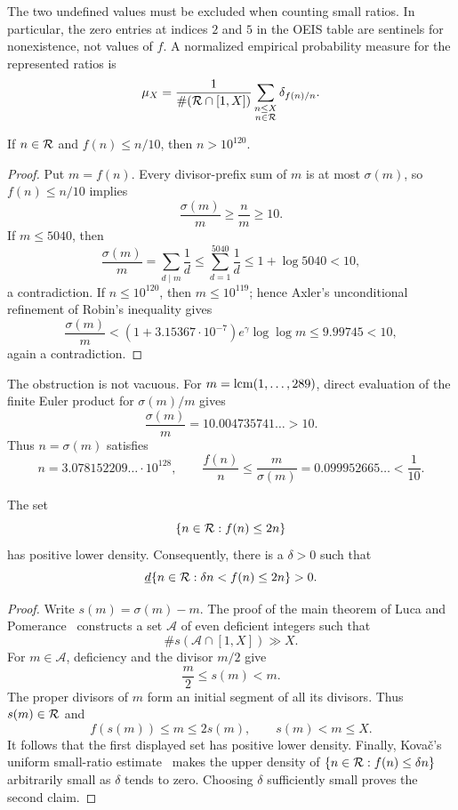 The two undefined values must be excluded when counting small ratios.
In particular, the zero entries at indices $2$ and $5$ in the OEIS table
\cite{OEIS1054} are sentinels for nonexistence, not values of $f$.
A normalized empirical probability measure for the represented ratios is
\[
 \mu_X=
 \frac{1}{\#(\mathcal R\cap[1,X])}
 \sum_{\substack{n\leq X\\n\in\mathcal R}}
 \delta_{f(n)/n}.
\]

\begin{proposition}
\label{prop:fraiture-small-ratio}
If $n\in\mathcal R$ and $f(n)\leq n/10$, then $n>10^{120}$.
\end{proposition}

\begin{proof}
Put $m=f(n)$.  Every divisor-prefix sum of $m$ is at most $\sigma(m)$,
so $f(n)\leq n/10$ implies
\[
 \frac{\sigma(m)}m\geq\frac nm\geq10.
\]
If $m\leq5040$, then
\[
 \frac{\sigma(m)}m=\sum_{d\mid m}\frac1d
 \leq\sum_{d=1}^{5040}\frac1d
 \leq1+\log5040<10,
\]
a contradiction.  If $n\leq10^{120}$, then $m\leq10^{119}$; hence
Axler's unconditional refinement of Robin's inequality
\cite[Corollary 2]{AxlerRobin} gives
\[
 \frac{\sigma(m)}m
 <(1+3.15367\cdot10^{-7})e^\gamma\log\log m
 \leq9.99745<10,
\]
again a contradiction.
\end{proof}

The obstruction is not vacuous.  For
$m=\operatorname{lcm}(1,\ldots,289)$, direct evaluation of the finite Euler product for
$\sigma(m)/m$ gives
\[
 \frac{\sigma(m)}m=10.004735741\ldots>10.
\]
Thus $n=\sigma(m)$ satisfies
\[
 n=3.078152209\ldots\cdot10^{128},
 \qquad
 \frac{f(n)}n\leq\frac m{\sigma(m)}
 =0.099952665\ldots<\frac1{10}.
\]

\begin{proposition}
\label{prop:fraiture-positive-mass}
The set
\[
 \{n\in\mathcal R:f(n)\leq2n\}
\]
has positive lower density.  Consequently, there is a $\delta>0$ such
that
\[
 \underline d\{n\in\mathcal R:\delta n<f(n)\leq2n\}>0.
\]
\end{proposition}

\begin{proof}
Write $s(m)=\sigma(m)-m$.  The proof of the main theorem of Luca and
Pomerance~\cite[proof of Theorem 1.2, \S3]{LucaPomerance} constructs a set
$\mathcal A$ of even deficient integers such that
\[
 \#s(\mathcal A\cap[1,X])\gg X.
\]
For $m\in\mathcal A$, deficiency and the divisor $m/2$ give
\[
 \frac m2\leq s(m)<m.
\]
The proper divisors of $m$ form an initial segment of all its divisors.
Thus $s(m)\in\mathcal R$ and
\[
 f(s(m))\leq m\leq2s(m),
 \qquad s(m)<m\leq X.
\]
It follows that the first displayed set has positive lower density.
Finally, Kova\v{c}'s uniform small-ratio estimate~\cite{Kovac1054} makes the upper density of
$\{n\in\mathcal R:f(n)\leq\delta n\}$ arbitrarily small as $\delta$ tends
to zero.  Choosing $\delta$ sufficiently small proves the second claim.
\end{proof}

